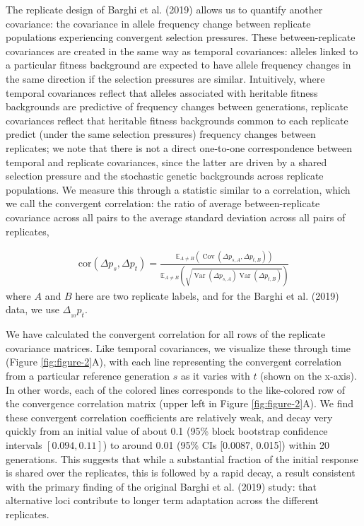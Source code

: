 \documentclass[9pt,twocolumn,twoside]{pnas-new}
\newcommand{\E}{\mathbb{E}}
\DeclareMathOperator{\var}{Var}
\DeclareMathOperator{\cov}{Cov}
\begin{document}
The replicate design of Barghi et al. (2019) allows us to quantify another
covariance: the covariance in allele frequency change between replicate
populations experiencing convergent selection pressures. These
between-replicate covariances are created in the same way as temporal
covariances: alleles linked to a particular fitness background are expected to
have allele frequency changes in the same direction if the selection pressures
are similar. Intuitively, where temporal covariances reflect that alleles
associated with heritable fitness backgrounds are predictive of frequency
changes between generations, replicate covariances reflect that heritable
fitness backgrounds common to each replicate predict (under the same selection
pressures) frequency changes between replicates; we note that there is not
  a direct one-to-one correspondence between temporal and replicate
  covariances, since the latter are driven by a shared selection pressure and
  the stochastic genetic backgrounds across replicate populations. We measure
  this through a statistic similar to a correlation, which we call the
  convergent correlation: the ratio of average between-replicate covariance
  across all pairs to the average standard deviation across all pairs of
  replicates, 


\begin{align}
  \label{eq:conv-corr}
  \mathrm{cor}(\Delta p_s, \Delta p_t) = \frac{\E_{A\ne B} \left( \cov(\Delta p_{s,A}, \Delta p_{t,B}) \right)}{\E_{A\ne B} \left( \sqrt{\var(\Delta p_{s,A}) \var(\Delta p_{t,B})} \right)}
\end{align}
%
where $A$ and $B$ here are two replicate labels, and for the
Barghi et al. (2019) data, we use $\Delta_{_{10}} p_t$. 

We have calculated the convergent correlation for all rows of the replicate
covariance matrices. Like temporal covariances, we visualize these through time
(Figure \ref{fig:figure-2}A), with each line representing the convergent
correlation from a particular reference generation $s$ as it varies with $t$
(shown on the x-axis). In other words, each of the colored lines corresponds to
the like-colored row of the convergence correlation matrix (upper left in
Figure \ref{fig:figure-2}A). We find these convergent correlation coefficients
are relatively weak, and decay very quickly from an initial value of about 0.1
(95\% block bootstrap confidence intervals $[0.094, 0.11]$) to around 0.01
(95\% CIs [0.0087, 0.015]) within 20 generations. This suggests that while a
substantial fraction of the initial response is shared over the replicates,
this is followed by a rapid decay, a result consistent with the primary finding
of the original Barghi et al. (2019) study: that alternative loci
contribute to longer term adaptation across the different replicates. 
\end{document}
